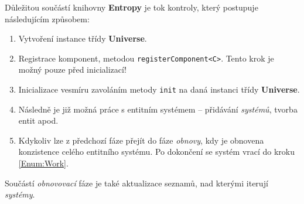 Důležitou součástí knihovny \textbf{Entropy} je tok kontroly, který postupuje následujícím způsobem: 
\begin{enumerate}
	\item Vytvoření instance třídy \textbf{Universe}.
	\item Registrace komponent, metodou \texttt{registerComponent<C>}. Tento krok je možný pouze před inicializací!
	\item Inicializace vesmíru zavoláním metody \texttt{init} na daná instanci třídy \textbf{Universe}.
	\item Následně je již možná práce s entitním systémem -- přidávání \emph{systémů}, tvorba entit apod. \label{Enum:Work}
	\item Kdykoliv lze z předchozí fáze přejít do fáze \emph{obnovy}, kdy je obnovena konzistence celého entitního systému. Po dokončení se systém vrací do kroku \ref{Enum:Work}.
\end{enumerate}

\noindent Součástí \emph{obnovovací} fáze je také aktualizace seznamů, nad kterými iterují \emph{systémy}. 



